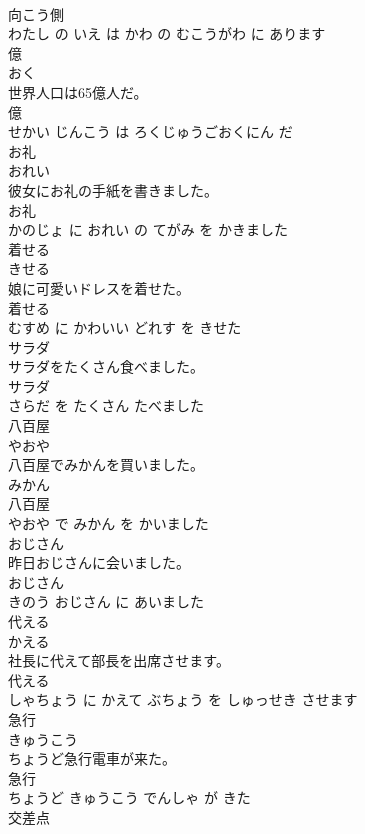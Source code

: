 \documentclass[8pt]{extreport}
\begin{document}
\begin{CJK}{UTF8}{min}
\\	向こう側 
\\	わたし の いえ は かわ の むこうがわ に あります			
\\	億	
\\	おく			
\\	世界人口は65億人だ。	
\\	億 
\\	せかい じんこう は ろくじゅうごおくにん だ			
\\	お礼	
\\	おれい			
\\	彼女にお礼の手紙を書きました。	
\\	お礼 
\\	かのじょ に おれい の てがみ を かきました			
\\	着せる	
\\	きせる			
\\	娘に可愛いドレスを着せた。	
\\	着せる 
\\	むすめ に かわいい どれす を きせた			
\\	サラダ	
\\	サラダをたくさん食べました。	
\\	サラダ 
\\	さらだ を たくさん たべました			
\\	八百屋	
\\	やおや			
\\	八百屋でみかんを買いました。	
\\	みかん 
\\	八百屋 
\\	やおや で みかん を かいました			
\\	おじさん	
\\	昨日おじさんに会いました。	
\\	おじさん 
\\	きのう おじさん に あいました			
\\	代える	
\\	かえる			
\\	社長に代えて部長を出席させます。	
\\	代える 
\\	しゃちょう に かえて ぶちょう を しゅっせき させます			
\\	急行	
\\	きゅうこう			
\\	ちょうど急行電車が来た。	
\\	急行 
\\	ちょうど きゅうこう でんしゃ が きた			
\\	交差点	

\end{CJK}
\end{document}
